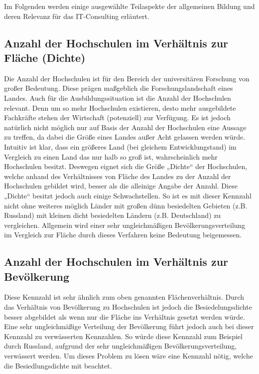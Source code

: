 Im Folgenden werden einige ausgewählte Teilaspekte der allgemeinen Bildung und deren Relevanz für das IT-Consulting erläutert.

\subsection*{Anzahl der Hochschulen im Verhältnis zur Fläche (Dichte)}
Die Anzahl der Hochschulen ist für den Bereich der universitären Forschung von großer Bedeutung. Diese prägen maßgeblich die Forschungslandschaft eines Landes. Auch für die Ausbildungssituation ist die Anzahl der Hochschulen relevant. Denn um so mehr Hochschulen existieren, desto mehr ausgebildete Fachkräfte stehen der Wirtschaft (potenziell) zur Verfügung. 
Es ist jedoch natürlich nicht möglich nur auf Basis der Anzahl der Hochschulen eine Aussage zu treffen, da dabei die Größe eines Landes außer Acht gelassen werden würde. Intuitiv ist klar, dass ein größeres Land (bei gleichem Entwicklungstand) im Vergleich zu einen Land das nur halb so groß ist, wahrscheinlich mehr Hochschulen besitzt. Deswegen eignet sich die Größe „Dichte“ der Hochschulen, welche anhand des Verhältnisses von  Fläche des Landes zu der Anzahl der Hochschulen gebildet wird, besser als die alleinige Angabe der Anzahl.
Diese „Dichte“ besitzt jedoch auch einige Schwachstellen. So ist es mit dieser Kennzahl nicht ohne weiteres möglich Länder mit großen dünn besiedelten Gebieten (z.B. Russland) mit kleinen dicht besiedelten Ländern (z.B. Deutschland) zu vergleichen. Allgemein wird einer sehr ungleichmäßigen Bevölkerungsverteilung im Vergleich zur Fläche durch dieses Verfahren keine Bedeutung beigemessen.

\subsection*{Anzahl der Hochschulen im Verhältnis zur Bevölkerung}
Diese Kennzahl ist sehr ähnlich zum oben genannten Flächenverhältnis. Durch das Verhältnis von Bevölkerung zu Hochschulen ist jedoch die Besiedelungsdichte besser abgebildet als wenn nur die Fläche ins Verhältnis gesetzt werden würde.
Eine sehr ungleichmäßige Verteilung der Bevölkerung führt jedoch auch bei dieser Kennzahl zu verwässerten Kennzahlen. So würde diese Kennzahl zum Beispiel durch Russland, aufgrund der sehr ungleichmäßigen Bevölkerungsverteilung, verwässert werden. Um dieses Problem zu lösen wäre eine Kennzahl nötig, welche die Besiedlungsdichte mit beachtet.

